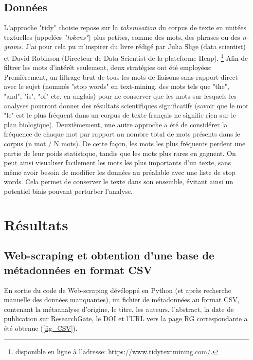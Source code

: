 \documentclass{book}
\begin{document}
\section{Données}
\noindent
L'approche "tidy" choisie repose sur la \textit{tokenisation} du corpus
de texte en unitées textuelles (appelées \textit{"tokens"}) plus petites, comme
des mots, des phrases ou des \textit{n-grams}. J'ai pour cela pu m'inspirer du
livre rédigé par Julia Slige (data scientist) et David Robinson (Directeur de
Data Scientist de la plateforme Heap). \footnote{disponible en ligne à l'adresse:
https://www.tidytextmining.com/.} Afin de filtrer les mots d'intérêt seulement, deux stratégies ont été
employées: Premièrement, un filtrage brut de tous les mots de liaisons sans
rapport direct avec le sujet (nommés "stop words" en text-mining, des mots tels
que "the", "and", "is", "of" etc. en anglais) pour ne conserver que les mots
sur lesquels les analyses pourront donner des résultats scientifiques
significatifs (savoir que le mot "le" est le plus fréquent dans un corpus de
texte français ne signifie rien sur le plan biologique). Deuxièmement, une
autre approche a été de considérer la fréquence de chaque mot par rapport au
nombre total de mots présents dans le corpus (n mot / N mots). De cette façon,
les mots les plus fréquents perdent une partie de leur poids statistique, tandis que les mots plus rares en gagnent. On peut ainsi visualiser facilement les mots les plus importants d'un texte, sans même
avoir besoin de modifier les données au préalable avec une liste de stop words.
Cela permet de conserver le texte dans son ensemble, évitant ainsi un potentiel
biais pouvant perturber l'analyse.

\chapter{\label{Troisième Chapitre}Résultats}
\section{Web-scraping et obtention d'une base de métadonnées en format CSV}
\noindent
En sortie du code de Web-scraping dévéloppé en Python (et après recherche manuelle des données manquantes), un fichier de métadonnées au format CSV, contenant la métaanalyse d'origine, le titre, les auteurs, l'abstract, la date de publication sur ResearchGate, le DOI et l'URL vers la page RG correspondante a été obtenue (\cref{fig_CSV}).
\end{document}
